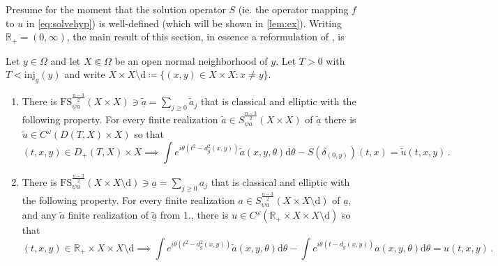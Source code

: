 \documentclass[
	fontsize=11pt, 
	twoside=false, 
	abstract=true, 
	a4paper,
]{scrartcl}
\newcommand{\RR}{\mathbb{R}}
\newcommand{\DD}{\mathscr{D}}
\newcommand{\dd}{\mathrm{d}}
\newcommand{\del}{\partial}
\newcommand{\td}[1]{\tilde{#1}}
\newcommand{\ud}[1]{\underline{#1}}
\begin{document}
Presume for the moment that the solution operator $S$ (ie. the operator mapping $f$ to $u$ in \cref{eq:solvehyp}) is well-defined (which will be shown in \cref{lem:ex}). Writing $\RR_+ = (0,\infty)$, the main result of this section, in essence a reformulation of \cite[Prop.~17.4.3]{zbMATH05129478}, is
\begin{theorem}\label{thm:paraana} 
	Let $y\in \Omega$ and let $X \Subset \Omega$ be an open normal neighborhood of $y$. Let $T>0$ with $T < \mathrm{inj}_g(y)$ and write $X\times X\setminus\mathrm{d} \coloneqq \{(x,y)\in X\times X\colon x\neq y\}$.  
	\begin{enumerate}
	\item There is $\mathrm{FS}_{\psi a}^{\frac{n-3}{2}}(X\times X) \ni \ud{\td{a}} = \sum_{j\geq 0} \td{a}_j$ that is classical and elliptic with the following property. For every finite realization $\td{a} \in S_{\psi a}^{\frac{n-3}{2}}(X\times X)$ of $\ud{\td{a}}$ there is $\td{u}\in C^\omega(D(T,X)\times X)$ so that %
	\begin{equation*}%
	(t,x,y)\in D_+(T,X)\times X\implies \int e^{i\theta(t^2-d_g^2(x,y))}\td{a}(x,y,\theta)\dd\theta - S(\delta_{(0,y)})(t,x) = \td{u}(t,x,y)\,.
	\end{equation*}
	\item There is $\mathrm{FS}_{\psi a}^{\frac{n-3}{2}}(X\times X\setminus\mathrm{d}) \ni \ud{a} = \sum_{j\geq 0} a_j$ that is classical and elliptic with the following property. For every finite realization $a \in S_{\psi a}^{\frac{n-3}{2}}(X\times X\setminus\mathrm{d})$ of $\ud{a}$, and any $\td{a}$ finite realization of $\ud{\td{a}}$ from 1., there is $u\in C^\omega(\RR_+\times X\times X\setminus \mathrm{d})$ so that %
	\[
		(t,x,y)\in \RR_+\times X\times X\setminus\mathrm{d}\implies \int e^{i\theta(t^2-d_g^2(x,y))}\td{a}(x,y,\theta)\dd\theta - \int e^{i\theta(t-d_g(x,y))}a(x,y,\theta)\dd\theta = u(t,x,y)\,.
	\]
	\end{enumerate}
\end{theorem}
\end{document}
